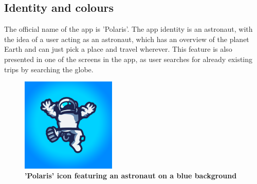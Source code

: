 \subsection{Identity and colours}
\hspace{\parindent}The official name of the app is 'Polaris'. The app identity is an astronaut, with the idea of a user acting as an astronaut, which has an overview of the planet Earth and can just pick a place and travel wherever. This feature is also presented in one of the screens in the app, as user searches for already existing trips by searching the globe.

\begin{figure}[!htb]
\centering
\includegraphics[width=0.4\textwidth]{../Images/PolarisIcon.png}
\caption{\label{fig:dbapiuser}\textbf{'Polaris' icon featuring an astronaut on a blue background}}
\end{figure} 

